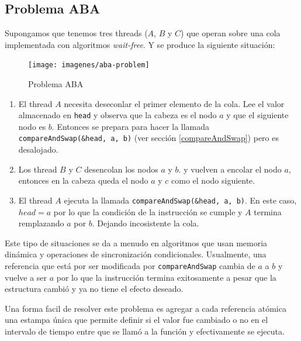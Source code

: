 \subsection{Problema ABA}
Supongamos que tenemos tres threads ($A$, $B$ y $C$) que operan sobre una cola implementada con algoritmos \textit{wait-free}. Y se produce la siguiente situación:

\begin{figure}[H]
    \centering
    \texttt{[image: imagenes/aba-problem]}
    \caption{Problema ABA}
    \label{fig:aba-problem}
\end{figure}

\begin{enumerate}
    \item El thread $A$ necesita deseconlar el primer elemento de la cola. Lee el valor almacenado en \texttt{head} y  observa que la cabeza es el nodo $a$ y que el siguiente nodo es $b$. Entonces se prepara para hacer la llamada \texttt{compareAndSwap(\&head, a, b)} (ver sección \ref{compareAndSwap}) pero es desalojado.
    \item Los thread $B$ y $C$ desencolan los nodos $a$ y $b$. y vuelven a encolar el nodo $a$, entonces en la cabeza queda el nodo $a$ y $c$ como el nodo siguiente.
    \item El thread $A$ ejecuta la llamada  \texttt{compareAndSwap(\&head, a, b)}. En este caso, $head = a$ por lo que la condición de la instrucción se cumple y $A$ termina remplazando $a$ por $b$. Dejando incosistente la cola.
\end{enumerate}

Este tipo de situaciones se da a menudo en algoritmos que usan memoria dinámica y operaciones de sincronización  condicionales. Usualmente, una referencia que está por ser modificada por \texttt{compareAndSwap} cambia de $a$ a $b$ y vuelve a ser $a$ por lo que la instrucción termina exitosamente a pesar que la estructura cambió y ya no tiene el efecto deseado.

Una forma facil de resolver este problema es agregar a cada referencia atómica una estampa única que permite definir si el valor fue cambiado o no en el intervalo de tiempo entre que se llamó a la función y efectivamente se ejecuta.

\printbibliography[keyword=progConcurr,title=Bibliografía]
